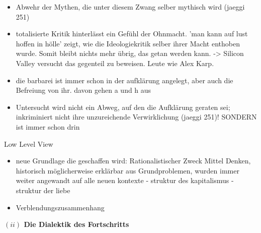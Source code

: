 \documentclass[a4paper, 12pt]{article}
\begin{document}
\begin{onehalfspace}
\begin{itemize}

  \item Abwehr der Mythen, die unter diesem Zwang selber mythisch wird (jaeggi 251)
  \item totalisierte Kritik hinterlässt ein Gefühl der Ohnmacht. 'man kann auf lust hoffen in hölle' zeigt, wie die Ideologiekritik selber ihrer Macht enthoben wurde. Somit bleibt nichts mehr übrig, das getan werden kann. -> Silicon Valley versucht das gegenteil zu beweisen. Leute wie Alex Karp.
  \item die barbarei ist immer schon in der aufklärung angelegt, aber auch die Befreiung von ihr. davon gehen a und h aus
  \item Untersucht wird nicht ein Abweg, auf den die Aufklärung geraten sei; inkriminiert nicht ihre unzureichende Verwirklichung (jaeggi 251)! SONDERN ist immer schon drin
\end{itemize}

Low Level View

\begin{itemize}
  \item neue Grundlage die geschaffen wird: Rationalistischer Zweck Mittel Denken, historisch möglicherweise erklärbar aus Grundproblemen, wurden immer weiter angewandt auf alle neuen kontexte - struktur des kapitalismus - struktur der liebe
  \item Verblendungszusammenhang
\end{itemize}


\vspace{5mm}
\noindent\textbf{$(ii)$ Die Dialektik des Fortschritts}

\noindent 


\end{onehalfspace}
\end{document}
